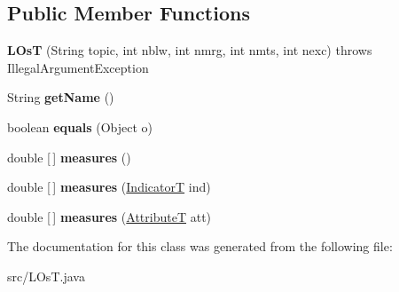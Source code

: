 \subsection*{Public Member Functions}
\begin{DoxyCompactItemize}
\item 
\mbox{\label{classsrc_1_1LOsT_ae27763b81f31daeeabe518badd96635f}} 
{\bfseries L\+OsT} (String topic, int nblw, int nmrg, int nmts, int nexc)  throws Illegal\+Argument\+Exception
\item 
\mbox{\label{classsrc_1_1LOsT_a02ef8179a6c3ffb078d78e10f83fdad3}} 
String {\bfseries get\+Name} ()
\item 
\mbox{\label{classsrc_1_1LOsT_a0ed196443c0d5b13a5acacfaf2a7c6fa}} 
boolean {\bfseries equals} (Object o)
\item 
\mbox{\label{classsrc_1_1LOsT_a2750f9ddf1a580cf01c0f40617cb707a}} 
double \mbox{[}$\,$\mbox{]} {\bfseries measures} ()
\item 
\mbox{\label{classsrc_1_1LOsT_ac13be4bc4a4bc682ee2d2c244a0a7b87}} 
double \mbox{[}$\,$\mbox{]} {\bfseries measures} (\hyperlink{enumsrc_1_1IndicatorT}{IndicatorT} ind)
\item 
\mbox{\label{classsrc_1_1LOsT_aa2833e1ee68b2b20b2bdfbf92d032b18}} 
double \mbox{[}$\,$\mbox{]} {\bfseries measures} (\hyperlink{classsrc_1_1AttributeT}{AttributeT} att)
\end{DoxyCompactItemize}


The documentation for this class was generated from the following file\+:\begin{DoxyCompactItemize}
\item 
src/L\+Os\+T.\+java\end{DoxyCompactItemize}
